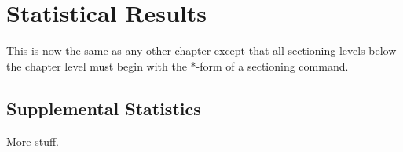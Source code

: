 \chapter{Statistical Results}

This is now the same as any other chapter except that
all sectioning levels below the chapter level must begin
with the *-form of a sectioning command.

\section*{Supplemental Statistics}

More stuff.
